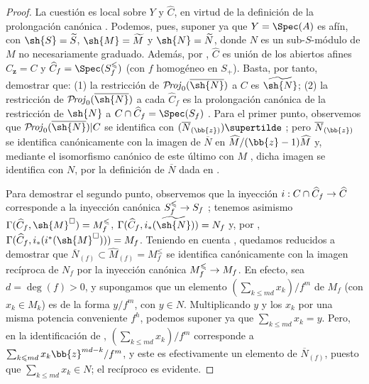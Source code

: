\documentclass[oneside,10pt]{amsart}
\makeatletter
\renewcommand{\leq}{\leqslant}
\newcommand{\ega@arrow}[2]{\mathchoice{#1}{#2}{#2}{#2}}
\renewcommand{\to}{\ega@arrow{\longrightarrow}{\rightarrow}}
\def\shProj{\mathcal{P}\!\mathit{roj}}
\makeatother
\begin{document}
\begin{proof}
La cuestión es local sobre $Y$ y $\widehat{C}$, en virtud de la definición de la prolongación canónica .
Podemos, pues, suponer ya que $Y=\Spec(A)$ es afín, con $\sh{S}=\widetilde{S}$, $\sh{M}=\widetilde{M}$ y $\sh{N}=\widetilde{N}$, donde $N$ es un sub-$S$-módulo de $M$ no necesariamente graduado.
Además, por , $\widehat{C}$ es unión de los abiertos afines $\widehat C_{\mathbf z}=C$ y $\widehat{C}_f=\Spec(S_f^\leq)$ (con $f$ homogéneo en $S_+$).
Basta, por tanto, demostrar que: (1) la restricción de $\shProj_0(\overline{\sh{N}})$ a $C$ es $\widetilde{\sh{N}}$; (2) la restricción de $\shProj_0(\overline{\sh{N}})$ a cada $\widehat{C}_f$ es la prolongación canónica de la restricción de $\sh{N}$ a $C\cap\widehat{C}_f=\Spec(S_f)$ .
Para el primer punto, observemos que $\shProj_0(\overline{\sh{N}})|C$ se identifica con $(\overline{N}_{(\bb{z})})\supertilde$ ;
pero $\overline{N}_{(\bb{z})}$ se identifica canónicamente  con la imagen de $\overline{N}$ en $\widehat{M}/(\bb{z}-1)\widehat{M}$ y, mediante el isomorfismo canónico de este último con $M$ , dicha imagen se identifica con $N$, por la definición de $\overline{N}$ dada en .

Para demostrar el segundo punto, observemos que la inyección $i:C\cap\widehat{C}_f\to\widehat{C}$ corresponde a la inyección canónica $S_f^\leq\to S_f$ ;
tenemos asimismo $\Gamma(\widehat{C}_f,\sh{M}^\square)=M_f^\leq$, $\Gamma(\widehat{C}_f,i_*(\widetilde{\sh{N}}))=N_f$ y, por , $\Gamma(\widehat{C}_f,i_*(i^*(\sh{M}^\square)))=M_f$.
Teniendo en cuenta , quedamos reducidos a demostrar que $\overline{N}_{(f)}\subset\widehat{M}_{(f)}=M_f^\leq$ se identifica canónicamente con la imagen recíproca de $N_f$ por la inyección canónica $M_f^\leq\to M_f$.
En efecto, sea $d=\deg(f)>0$, y supongamos que un elemento $(\sum_{k\leq md}x_k)/f^m$ de $M_f$ (con $x_k\in M_k$) es de la forma $y/f^m$, con $y\in N$.
Multiplicando $y$ y los $x_k$ por una misma potencia conveniente $f^h$, podemos suponer ya que $\sum_{k\leq md}x_k=y$.
Pero, en la identificación de , $(\sum_{k\leq md}x_k)/f^m$ corresponde a $\sum_{k\leq md}x_k\bb{z}^{md-k}/f^m$, y este es efectivamente un elemento de $\overline{N}_{(f)}$, puesto que $\sum_{k\leq md}x_k\in N$;
el recíproco es evidente.
\end{proof}
\end{document}
